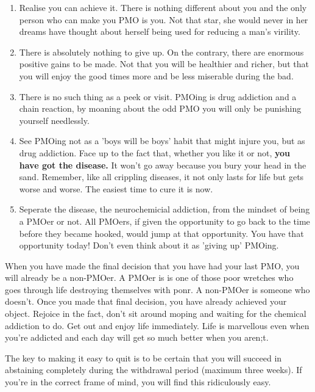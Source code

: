 \documentclass[easypeasy]{subfiles}
\begin{document}
\begin{enumerate}
  \item Realise you can achieve it. There is nothing different about you and the only person who can make you PMO is you. Not that star, she would never in her dreams have thought about herself being used for reducing a man's virility.

  \item There is absolutely nothing to give up. On the contrary, there are enormous positive gains to be made. Not that you will be healthier and richer, but that you will enjoy the good times more and be less miserable during the bad.

  \item There is no such thing as a peek or visit. PMOing is drug addiction and a chain reaction, by moaning about the odd PMO you will only be punishing yourself needlessly.

  \item See PMOing not as a 'boys will be boys' habit that might injure you, but as drug addiction. Face up to the fact that, whether you like it or not, \textbf{you have got the disease.} It won't go away because you bury your head in the sand. Remember, like all crippling diseases, it not only lasts for life but gets worse and worse. The easiest time to cure it is now.

  \item Seperate the disease, the neurochemicial addiction, from the mindset of being a PMOer or not. All PMOers, if given the opportunity to go back to the time before they became hooked, would jump at that opportunity. You have that opportunity today! Don't even think about it as 'giving up' PMOing.

\end{enumerate}

When you have made the final decision that you have had your last PMO, you will already be a non-PMOer. A PMOer is is one of those poor wretches who goes through life destroying themselves with ponr. A non-PMOer is someone who doesn't. Once you made that final decision, you have already achieved your object. Rejoice in the fact, don't sit around moping and waiting for the chemical addiction to do. Get out and enjoy life immediately. Life is marvellous even when you're addicted and each day will get so much better when you aren;t.

The key to making it easy to quit is to be certain that you will succeed in abstaining completely during the withdrawal period (maximum three weeks). If you're in the correct frame of mind, you will find this ridiculously easy.
\end{document}
